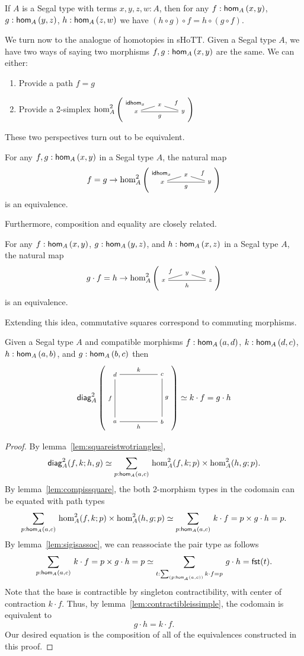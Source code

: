 \documentclass[main.tex]{subfiles}
\begin{document}
\begin{lemma}
    If $A$ is a Segal type with terms $x,y,z,w : A$, then for any $f : \ho[A]{x}{y}$, $g : \ho[A]{y}{z}$, $h : \ho[A]{z}{w}$ we have $(h \circ g )  \circ f = h \circ (g \circ f).$
\end{lemma}

We turn now to the analogue of homotopies in sHoTT. Given a Segal type $A$, we have two ways of saying two morphisms $f,g : \ho[A]{x}{y}$ are the same. We can either:
\begin{enumerate}
    \item Provide a path $f = g$
    \item Provide a 2-simplex $\homtwo{A}(x,x,y,\idhom{x},f,g)$
\end{enumerate}
These two perspectives turn out to be equivalent.
\begin{lemma}
    \label{lem:pathis2mor}
    For any $f,g : \ho[A]{x}{y}$ in a Segal type $A$, the natural map
    $$f = g \to \homtwo{A}(x,x,y, \idhom{x}, f,g)$$
    is an equivalence.
\end{lemma}
Furthermore, composition and equality are closely related.
\begin{lemma}
    \label{lem:compequalis2mor}
    For any $f: \ho[A]{x}{y}$, $g : \ho[A]{y}{z}$, and $h : \ho[A]{x}{z}$ in a Segal type $A$, the natural map
    $$g \cdot f = h \to \homtwo{A}(x,y,z,f,g,h)$$
    is an equivalence.
\end{lemma}
Extending this idea, commutative squares correspond to commuting morphisms.
\begin{lemma}
    \label{lem:compissquare}
    Given a Segal type $A$ and compatible morphisms $f : \ho[A]{a}{d}$, \linebreak $k:\ho[A]{d}{c}$, $h:\ho[A]{a}{b}$, and $g : \ho[A]{b}{c}$ then
    \begin{equation}
        \diag{A}(a,b,c,d,f,k,h,g) \simeq k\cdot f = g \cdot h
    \end{equation}
\end{lemma}
\begin{proof}
By lemma~\cref{lem:squareistwotriangles},
$$        \diagshort{A}(a,b,c,d,f,k,h,g) \simeq \sm{p : \ho[A]{a}{c}}\homtwoshort{A}(a,d,c,f,k,p) \times \homtwoshort{A}(a,b,c,h,g,p) .$$
By lemma~\cref{lem:compissquare}, the both $2$-morphism types in the codomain can be equated with path types
$$\sm{p : \ho[A]{a}{c}}\homtwoshort{A}(a,d,c,f,k,p) \times \homtwoshort{A}(a,b,c,h,g,p) \simeq \sm{p : \ho[A]{a}{c}} k\cdot f = p \times g \cdot h = p.$$
By lemma~\cref{lem:sigisassoc}, we can reassociate the pair type as follows
$$\sm{p : \ho[A]{a}{c}} k\cdot f = p \times g \cdot h = p \simeq \sm{t : \sm{p : \ho[A]{a}{c}} k\cdot f = p } g \cdot h = \fst(t).$$
Note that the base is contractible by singleton contractibility, with center of contraction $k \cdot f$. Thus, by lemma~\cref{lem:contractibleissimple}, the codomain is equivalent to 
$$g \cdot h = k \cdot f. $$ Our desired equation is the composition of all of the equivalences constructed in this proof.
\end{proof}
\end{document}

